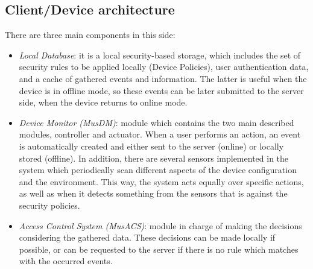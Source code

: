 
\subsection{Client/Device architecture}
\label{subsec:client}

There are three main components in this side:
\begin{itemize}
 	 \item \textit{Local Database}: it is a local security-based storage, which includes the set of security rules to be applied locally (Device Policies), user authentication data, and a cache of gathered events and information. The latter is useful when the device is in offline mode, so these events can be later submitted to the server side, when the device returns to online mode. 
 	 \item \textit{Device Monitor (MusDM)}: module which contains the two main described modules, controller and actuator. When a user performs an action, an event is automatically created and either sent to the server (online) or locally stored (offline). In addition, there are several sensors implemented in the system which periodically scan different aspects of the device configuration and the environment. This way, the system acts equally over specific actions, as well as when it detects something from the sensors that is against the security policies.
 	 \item \textit{Access Control System (MusACS)}: module in charge of making the decisions considering the gathered data. These decisions can be made locally if possible, or can be requested to the server if there is no rule which matches with the occurred events. 

\end{itemize}

